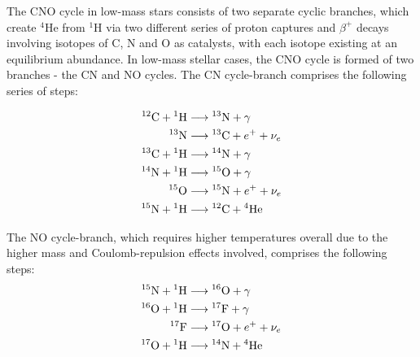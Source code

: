 \documentclass[12pt, a4paper]{report}
\begin{document}
The CNO cycle in low-mass stars consists of two separate cyclic branches, which create $^{4}$He from $^{1}$H via two different series of proton captures and $\beta ^{+}$ decays involving isotopes of C, N and O as catalysts, with each isotope existing at an equilibrium abundance. In low-mass stellar cases, the CNO cycle is formed of two branches - the CN and NO cycles. The CN cycle-branch comprises \citep{2005essp.book.....S} the following series of steps:



\begin{align}
\begin{split}
{}^{12}\textnormal{C} + {}^{1}\textnormal{H} & \longrightarrow {}^{13}\textnormal{N} + \gamma \\
{}^{13}\textnormal{N} & \longrightarrow {}^{13}\textnormal{C} + e^{+} + \nu_{e} \\
{}^{13}\textnormal{C} + {}^{1}\textnormal{H} & \longrightarrow {}^{14}\textnormal{N} + \gamma \\
{}^{14}\textnormal{N} + {}^{1}\textnormal{H} & \longrightarrow {}^{15}\textnormal{O} + \gamma \\
{}^{15}\textnormal{O} & \longrightarrow {}^{15}\textnormal{N} + e^{+} + \nu_{e} \\
{}^{15}\textnormal{N} + {}^{1}\textnormal{H} & \longrightarrow {}^{12}\textnormal{C} + {}^{4}\textnormal{He}
\end{split}
\end{align}

The NO cycle-branch, which requires higher temperatures overall due to the higher mass and Coulomb-repulsion effects involved, comprises the following steps:
\begin{align}
\begin{split}
{}^{15}\textnormal{N} + {}^{1}\textnormal{H} & \longrightarrow {}^{16}\textnormal{O} + \gamma \\
{}^{16}\textnormal{O} + {}^{1}\textnormal{H} & \longrightarrow {}^{17}\textnormal{F} + \gamma \\
{}^{17}\textnormal{F} & \longrightarrow {}^{17}\textnormal{O} + e^{+} + \nu_{e} \\
{}^{17}\textnormal{O} + {}^{1}\textnormal{H} & \longrightarrow {}^{14}\textnormal{N} + {}^{4}\textnormal{He}
\end{split}
\end{align}

\end{document}
